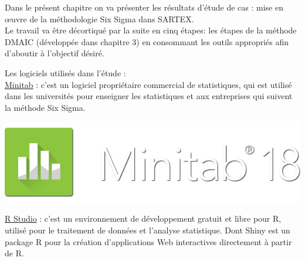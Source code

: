 \documentclass[12pt, a4paper]{thesis}
\begin{document}
Dans le présent chapitre on va présenter les résultats d’étude de cas : mise en œuvre de la méthodologie Six Sigma dans SARTEX.\\
Le travail va être décortiqué par la suite en cinq étapes: les étapes de la méthode DMAIC (développée dans chapitre 3) en consommant les outils appropriés afin d'aboutir à l'objectif désiré.

Les logiciels utilisés dans l'étude : \\
\underline{Minitab} : c’est un logiciel propriétaire commercial de statistiques, qui est utilisé dans les universités pour enseigner les statistiques et aux entreprises qui suivent la méthode Six Sigma.

\begin{center}
    \includegraphics[scale=0.2]{minitab.png}
\end{center}
\underline{R Studio} : c'est un environnement de développement gratuit et libre pour R, utilisé pour le traitement de données et l’analyse statistique. Dont Shiny est un package R  pour la création d'applications Web interactives directement à partir de R.
\end{document}
